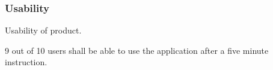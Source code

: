 \documentclass[10pt,a4paper]{article}
\begin{document}
\subsubsection{Usability}
Usability of product.
\begin{description}
	\item [Req \thesubsubsection {.\theusab} User friendly] 9 out of 10 users shall be able to use the application after a five minute instruction.
\end{description}









\end{document}

